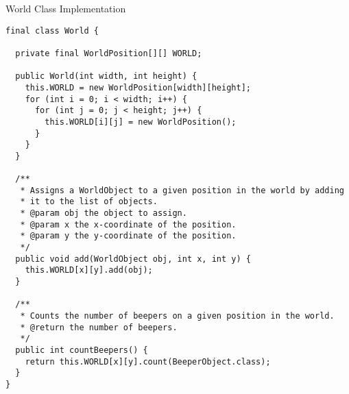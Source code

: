 \begin{cl}[]{World Class Implementation}
\begin{lstlisting}[language=MyJava]
final class World {
  
  private final WorldPosition[][] WORLD;

  public World(int width, int height) {
    this.WORLD = new WorldPosition[width][height];
    for (int i = 0; i < width; i++) {
      for (int j = 0; j < height; j++) {
        this.WORLD[i][j] = new WorldPosition();
      }
    }
  }

  /**
   * Assigns a WorldObject to a given position in the world by adding
   * it to the list of objects.
   * @param obj the object to assign.
   * @param x the x-coordinate of the position.
   * @param y the y-coordinate of the position.
   */
  public void add(WorldObject obj, int x, int y) {
    this.WORLD[x][y].add(obj);
  }

  /**
   * Counts the number of beepers on a given position in the world.
   * @return the number of beepers.
   */
  public int countBeepers() {
    return this.WORLD[x][y].count(BeeperObject.class);
  }
}
\end{lstlisting}
\end{cl}

